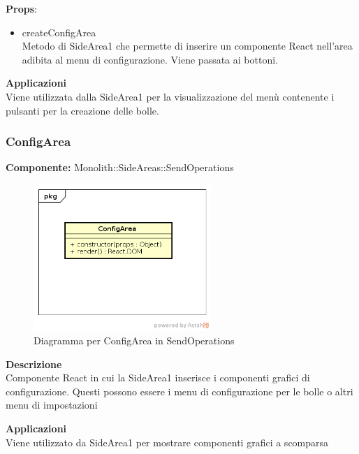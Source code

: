 \textbf{Props}:
\begin{itemize}
\item createConfigArea
\\
Metodo di SideArea1 che permette di inserire un componente React nell'area adibita al menu di configurazione. Viene passata ai bottoni.
\end{itemize} 


\textbf{Applicazioni}\\
Viene utilizzata dalla SideArea1 per la visualizzazione del menù contenente i pulsanti per la creazione delle bolle. 


\clearpage

\subsubsection{ConfigArea}
\textbf{Componente:}  Monolith::SideAreas::SendOperations\\
   \FloatBarrier
   \begin{figure}[ht]
   \centering
   \includegraphics[width=0.6\textwidth]{img/single-ConfigArea.png}
   \caption{{Diagramma per ConfigArea in SendOperations}}
\end{figure}
\FloatBarrier
\textbf{Descrizione}\\
Componente React in cui la SideArea1 inserisce i componenti grafici di configurazione. Questi possono essere i menu di configurazione per le bolle o altri menu di impostazioni 


\textbf{Applicazioni}\\
Viene utilizzato da SideArea1 per mostrare componenti grafici a scomparsa 


\clearpage

